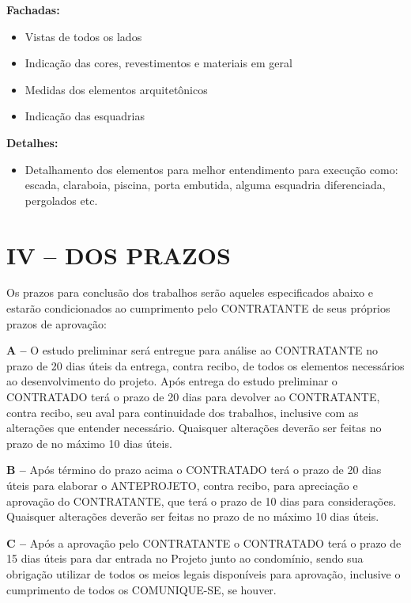 \documentclass[11pt,a4paper]{article}
\begin{document}
\vspace{0.2cm}
\noindent\textbf{Fachadas:}
\begin{itemize}
    \item Vistas de todos os lados
    \item Indicação das cores, revestimentos e materiais em geral
    \item Medidas dos elementos arquitetônicos
    \item Indicação das esquadrias
\end{itemize}

\vspace{0.2cm}
\noindent\textbf{Detalhes:}
\begin{itemize}
    \item Detalhamento dos elementos para melhor entendimento para execução como: escada, claraboia, piscina, porta embutida, alguma esquadria diferenciada, pergolados etc.
\end{itemize}

\section*{IV – DOS PRAZOS}
Os prazos para conclusão dos trabalhos serão aqueles especificados abaixo e estarão condicionados ao cumprimento pelo CONTRATANTE de seus próprios prazos de aprovação:

\noindent\textbf{A –} O estudo preliminar será entregue para análise ao CONTRATANTE no prazo de 20 dias úteis da entrega, contra recibo, de todos os elementos necessários ao desenvolvimento do projeto. Após entrega do estudo preliminar o CONTRATADO terá o prazo de 20 dias para devolver ao CONTRATANTE, contra recibo, seu aval para continuidade dos trabalhos, inclusive com as alterações que entender necessário. Quaisquer alterações deverão ser feitas no prazo de no máximo 10 dias úteis.

\noindent\textbf{B –} Após término do prazo acima o CONTRATADO terá o prazo de 20 dias úteis para elaborar o ANTEPROJETO, contra recibo, para apreciação e aprovação do CONTRATANTE, que terá o prazo de 10 dias para considerações. Quaisquer alterações deverão ser feitas no prazo de no máximo 10 dias úteis.

\noindent\textbf{C –} Após a aprovação pelo CONTRATANTE o CONTRATADO terá o prazo de 15 dias úteis para dar entrada no Projeto junto ao condomínio, sendo sua obrigação utilizar de todos os meios legais disponíveis para aprovação, inclusive o cumprimento de todos os COMUNIQUE-SE, se houver.
\end{document}
